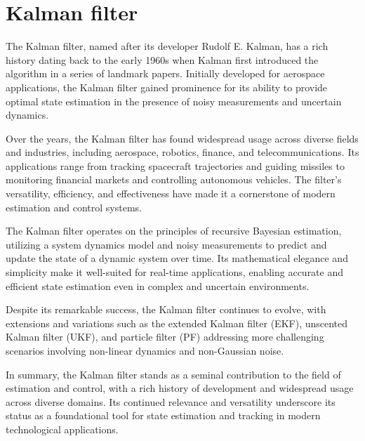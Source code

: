 \section{Kalman filter}
    \label{sec:Kalman}
The Kalman filter, named after its developer Rudolf E. Kalman, has a rich history dating back to the early 1960s when Kalman first introduced the algorithm in a series of landmark papers. Initially developed for aerospace applications, the Kalman filter gained prominence for its ability to provide optimal state estimation in the presence of noisy measurements and uncertain dynamics.

Over the years, the Kalman filter has found widespread usage across diverse fields and industries, including aerospace, robotics, finance, and telecommunications. Its applications range from tracking spacecraft trajectories and guiding missiles to monitoring financial markets and controlling autonomous vehicles. The filter's versatility, efficiency, and effectiveness have made it a cornerstone of modern estimation and control systems.

The Kalman filter operates on the principles of recursive Bayesian estimation, utilizing a system dynamics model and noisy measurements to predict and update the state of a dynamic system over time. Its mathematical elegance and simplicity make it well-suited for real-time applications, enabling accurate and efficient state estimation even in complex and uncertain environments.

Despite its remarkable success, the Kalman filter continues to evolve, with extensions and variations such as the
extended Kalman filter (EKF), unscented Kalman filter (UKF), and particle filter (PF) addressing more challenging scenarios involving non-linear dynamics and non-Gaussian noise.

In summary, the Kalman filter stands as a seminal contribution to the field of estimation and control, with a rich history of development and widespread usage across diverse domains. Its continued relevance and versatility underscore its status as a foundational tool for state estimation and tracking in modern technological applications.

